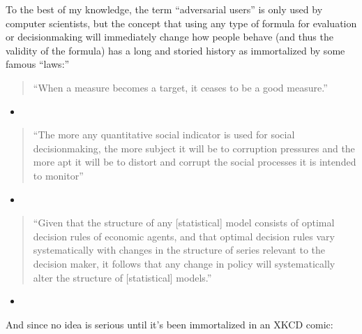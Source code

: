 \documentclass[letterpaper,10pt,english]{jupyterBook}
\begin{document}
\sphinxAtStartPar
To the best of my knowledge, the term “adversarial users” is only used by computer scientists, but the concept that using any type of formula for evaluation or decision\sphinxhyphen{}making will immediately change how people behave (and thus the validity of the formula) has a long and storied history as immortalized by some famous “laws:”
\begin{quote}

\sphinxAtStartPar
“When a measure becomes a target, it ceases to be a good measure.”
\end{quote}
\begin{itemize}
\item {} 
\sphinxAtStartPar
{}

\end{itemize}
\begin{quote}

\sphinxAtStartPar
“The more any quantitative social indicator is used for social decision\sphinxhyphen{}making, the more subject it will be to corruption pressures and the more apt it will be to distort and corrupt the social processes it is intended to monitor”
\end{quote}
\begin{itemize}
\item {} 
\sphinxAtStartPar
{}

\end{itemize}
\begin{quote}

\sphinxAtStartPar
“Given that the structure of any {[}statistical{]} model consists of optimal decision rules of economic agents, and that optimal decision rules vary systematically with changes in the structure of series relevant to the decision maker, it follows that any change in policy will systematically alter the structure of {[}statistical{]} models.”
\end{quote}
\begin{itemize}
\item {} 
\sphinxAtStartPar
{}

\end{itemize}

\sphinxAtStartPar
And since no idea is serious until it’s been immortalized in an XKCD comic:
\end{document}
